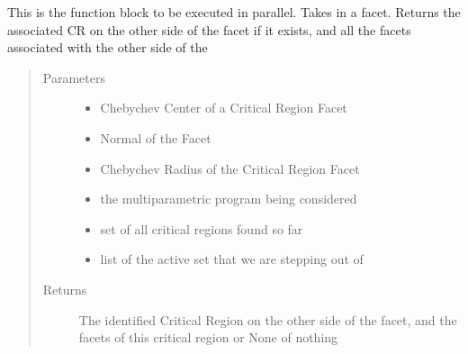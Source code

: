 \documentclass[letterpaper,10pt,english]{sphinxmanual}
\begin{document}
\begin{fulllineitems}
\label{\detokenize{ppopt.mp_solvers:ppopt.mp_solvers.mpqp_parallel_geometric.full_process}}
\sphinxAtStartPar
This is the function block to be executed in parallel. Takes in a facet. Returns the associated CR on the other side of the facet
if it exists, and all the facets associated with the other side of the
\begin{quote}\begin{description}
\item[{Parameters}] \leavevmode\begin{itemize}
\item {} 
\sphinxAtStartPar
{} \textendash{} Chebychev Center of a Critical Region Facet

\item {} 
\sphinxAtStartPar
{} \textendash{} Normal of the Facet

\item {} 
\sphinxAtStartPar
{} \textendash{} Chebychev Radius of the Critical Region Facet

\item {} 
\sphinxAtStartPar
{} \textendash{} the multiparametric program being considered

\item {} 
\sphinxAtStartPar
{} \textendash{} set of all critical regions found so far

\item {} 
\sphinxAtStartPar
{} \textendash{} list of the active set that we are stepping out of

\end{itemize}

\item[{Returns}] \leavevmode
\sphinxAtStartPar
The identified Critical Region on the other side of the facet, and the facets of this critical region or None of nothing

\end{description}\end{quote}

\end{fulllineitems}
\end{document}
